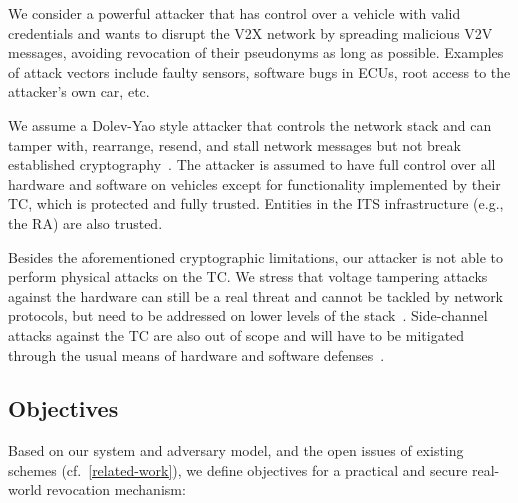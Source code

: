 We consider a powerful attacker that has control over a vehicle with valid
credentials and wants to disrupt the \ac{V2X} network by spreading malicious
\ac{V2V} messages, avoiding revocation of their pseudonyms as long as possible.
Examples of attack vectors include faulty sensors, software bugs in \acp{ECU}, root
access to the attacker's own car, etc.

We assume a Dolev-Yao style attacker that controls the network stack and can
tamper with, rearrange, resend, and stall network messages but not break
established cryptography~\cite{dolev1983security}. The attacker is assumed to
have full control over all hardware and software on vehicles except for
functionality implemented by their \ac{TC}, which is protected and fully
trusted. Entities in the \ac{ITS} infrastructure (e.g., the \ac{RA}) are also
trusted.

Besides the aforementioned cryptographic limitations, our attacker is not able
to perform physical attacks on the \ac{TC}. We stress that voltage tampering
attacks against the hardware can still be a real threat and cannot be tackled by
network protocols, but need to be addressed on lower levels of the
stack~\cite{chen2021voltpillager, murdock2020plundervolt}. Side-channel attacks
against the \ac{TC} are also out of scope and will have to be mitigated through
the usual means of hardware and software defenses~\cite{lou2021survey,
canella2019systematic}.

\subsection{Objectives}
\label{section:system-objectives}

Based on our system and adversary model, and the open issues of existing schemes
(cf.~\cref{related-work}), we define objectives for a practical and secure
real-world revocation mechanism:

